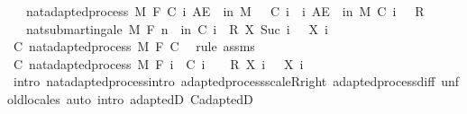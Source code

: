 \begin{isabellebody}
\ \ \ {\isachardoublequoteopen}nat{\isacharunderscore}{\kern0pt}adapted{\isacharunderscore}{\kern0pt}process\ M\ F\ C{\isachardoublequoteclose}\ {\isachardoublequoteopen}{\isasymAnd}i{\isachardot}{\kern0pt}\ AE\ {\isasymxi}\ in\ M{\isachardot}{\kern0pt}\ {}\ {\isasymle}\ C\ i\ {\isasymxi}{\isachardoublequoteclose}\ {\isachardoublequoteopen}{\isasymAnd}i{\isachardot}{\kern0pt}\ AE\ {\isasymxi}\ in\ M{\isachardot}{\kern0pt}\ C\ i\ {\isasymxi}\ {\isasymle}\ R{\isachardoublequoteclose}\isanewline
\ \ \ {\isachardoublequoteopen}nat{\isacharunderscore}{\kern0pt}submartingale\ M\ F\ {\isacharparenleft}{\kern0pt}{\isasymlambda}n\ {\isasymxi}{\isachardot}{\kern0pt}\ {\isasymSum}i{\isacharless}{\kern0pt}n{\isachardot}{\kern0pt}\ C\ i\ {\isasymxi}\ {\isacharasterisk}{\kern0pt}\isactrlsub R\ {\isacharparenleft}{\kern0pt}X\ {\isacharparenleft}{\kern0pt}Suc\ i{\isacharparenright}{\kern0pt}\ {\isasymxi}\ {\isacharminus}{\kern0pt}\ X\ i\ {\isasymxi}{\isacharparenright}{\kern0pt}{\isacharparenright}{\kern0pt}{\isachardoublequoteclose}\isanewline
%
\isadelimproof
%
\endisadelimproof
%
\isatagproof
{}\isamarkupfalse%
{\isacharminus}{\kern0pt}\isanewline
\ \ \isamarkupfalse%
\ C{\isacharcolon}{\kern0pt}\ nat{\isacharunderscore}{\kern0pt}adapted{\isacharunderscore}{\kern0pt}process\ M\ F\ C\ \isamarkupfalse%
\ {\isacharparenleft}{\kern0pt}rule\ assms{\isacharparenright}{\kern0pt}\isanewline
\ \ \isamarkupfalse%
\ C{\isacharprime}{\kern0pt}{\isacharcolon}{\kern0pt}\ nat{\isacharunderscore}{\kern0pt}adapted{\isacharunderscore}{\kern0pt}process\ M\ F\ {\isachardoublequoteopen}{\isasymlambda}i\ {\isasymxi}{\isachardot}{\kern0pt}\ C\ {\isacharparenleft}{\kern0pt}i\ {\isacharminus}{\kern0pt}\ {}{\isacharparenright}{\kern0pt}\ {\isasymxi}\ {\isacharasterisk}{\kern0pt}\isactrlsub R\ {\isacharparenleft}{\kern0pt}X\ i\ {\isasymxi}\ {\isacharminus}{\kern0pt}\ X\ {\isacharparenleft}{\kern0pt}i\ {\isacharminus}{\kern0pt}\ {}{\isacharparenright}{\kern0pt}\ {\isasymxi}{\isacharparenright}{\kern0pt}{\isachardoublequoteclose}\ \isamarkupfalse%
\ {\isacharparenleft}{\kern0pt}intro\ nat{\isacharunderscore}{\kern0pt}adapted{\isacharunderscore}{\kern0pt}process{\isachardot}{\kern0pt}intro\ adapted{\isacharunderscore}{\kern0pt}process{\isachardot}{\kern0pt}scaleR{\isacharunderscore}{\kern0pt}right\ adapted{\isacharunderscore}{\kern0pt}process{\isachardot}{\kern0pt}diff{\isacharcomma}{\kern0pt}\ unfold{\isacharunderscore}{\kern0pt}locales{\isacharparenright}{\kern0pt}\ {\isacharparenleft}{\kern0pt}auto\ intro{\isacharcolon}{\kern0pt}\ adaptedD\ C{\isachardot}{\kern0pt}adaptedD{\isacharparenright}{\kern0pt}{\isacharplus}{\kern0pt}\isanewline

\end{isabellebody}
